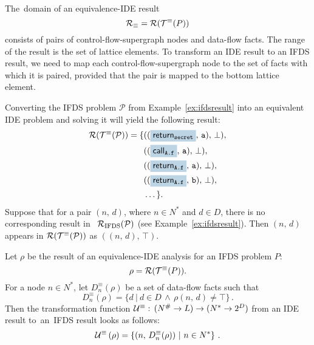 The~domain of an equivalence-IDE result 
\begin{equation}
  \mathcal R_\equiv=\mathcal R(\mathcal T^\equiv(P))
\end{equation}
consists of pairs of control-flow-supergraph nodes and data-flow facts. The range of the result is the set of lattice elements. To transform an IDE result to an IFDS result, we need to map each control-flow-supergraph node to the set of facts with which it is paired, provided that the pair is mapped to the bottom lattice element.

\begin{mdelete}
\begin{example}\label{ex:ideresult}
  Converting the IFDS problem $\mathcal P$ from Example~\ref{ex:ifdsresult} into an equivalent IDE problem and solving it will yield the following result:
    \small\begin{align*}
    \result(\transEq(\mathcal P))=\{&((\highlight{\textsf{return}_\texttt{secret}}{greyblue},\,\texttt a),\,\bot),\\
      &((\highlight{\textsf{call}_\texttt{A.f}}{greyblue},\,\texttt a),\,\bot),\\
      &((\highlight{\textsf{return}_\texttt{A.f}}{greyblue},\,\texttt a),\,\bot),\\
      &((\highlight{\textsf{return}_\texttt{A.f}}{greyblue},\,\texttt b),\,\bot),\\
      &\dots\}.\\
    \end{align*}\normalsize
  Suppose that for a pair $(n,\,d)$, where $n\in N^*$ and $d\in D$, there is no corresponding result in ~$\mathcal R_\text{IFDS}(\mathcal P)$ (see Example~\ref{ex:ifdsresult}). Then $(n,\,d)$ appears in $\mathcal R(\mathcal T^\equiv(\mathcal P))$ as $((n,\,d),\,\top)$.
\end{example}
\end{mdelete}

Let $\rho$ be the result of an equivalence-IDE analysis for an IFDS problem $P$:
\[
  \rho=\mathcal R(\mathcal T^\equiv(P)).
\]
For a node $n\in N^*$, let $D_n^\equiv(\rho)$ be a set of data-flow facts such that
\begin{equation}
  D_n^\equiv(\rho)=\{d\ |\ d\in D\,\wedge\,\rho(n,\,d)\ne\top\}\,.
\end{equation}
Then the transformation function
$\mathcal U^\equiv:\,(N^\#\to L)\to(N^*\to2^D)$
from an IDE result to~an~IFDS result looks as follows:
\begin{equation}
  \mathcal U^\equiv\left(\rho\right)=
    \left\{(n,\,D_n^\equiv(\rho))\ |\ n\in N^*\right\}\,.
\end{equation}

